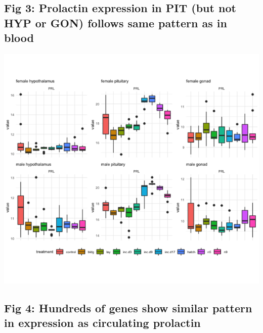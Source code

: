 \documentclass[10pt,letterpaper]{article}
\begin{document}
\hypertarget{fig-3-prolactin-expression-in-pit-but-not-hyp-or-gon-follows-same-pattern-as-in-blood}{%
\subsection{Fig 3: Prolactin expression in PIT (but not HYP or GON)
follows same pattern as in
blood}\label{fig-3-prolactin-expression-in-pit-but-not-hyp-or-gon-follows-same-pattern-as-in-blood}}

\includegraphics{characterization_manuscript_files/figure-latex/unnamed-chunk-5-1.pdf}

\hypertarget{fig-4-hundreds-of-genes-show-similar-pattern-in-expression-as-circulating-prolactin}{%
\subsection{Fig 4: Hundreds of genes show similar pattern in expression
as circulating
prolactin}\label{fig-4-hundreds-of-genes-show-similar-pattern-in-expression-as-circulating-prolactin}}
\end{document}

